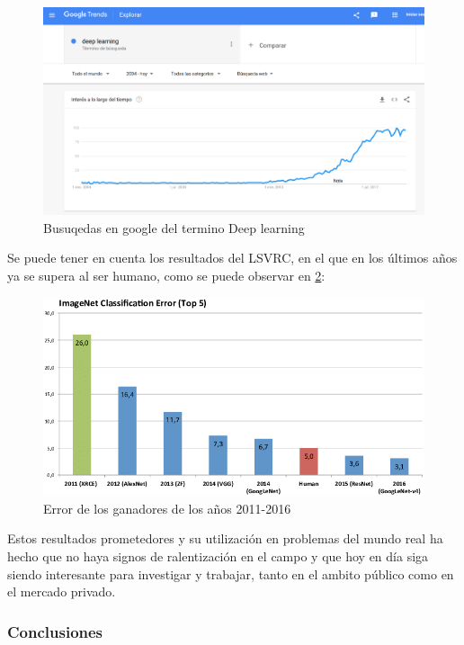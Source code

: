 \documentclass[12pt]{article}
\numberwithin{equation}{section}
\begin{document}
\begin{figure}[h]
    \centering
    \includegraphics[width=1\textwidth]{growth.png}
    \caption{Busuqedas en google del termino Deep learning}
    \label{fig:growth}
\end{figure}

Se puede tener en cuenta los resultados del LSVRC, en el que en los últimos años ya se supera al ser humano\cite{DBLP:journals/corr/YangH15}, como se puede observar en \ref{fig:errorLSVRC}:

\begin{figure}[h]
    \centering
    \includegraphics[width=1\textwidth]{Winner-results-of-the-ImageNet-large-scale-visual-recognition-challenge-LSVRC-of-the.png}
    \caption{Error de los ganadores de los años 2011-2016}
    \label{fig:errorLSVRC}
\end{figure}

Estos resultados prometedores y su utilización en problemas del mundo real ha hecho que no haya signos de ralentización en el campo y que hoy en día siga siendo interesante para investigar y trabajar, tanto en el ambito público como en el mercado privado.


\subsubsection{Conclusiones}
\end{document}
